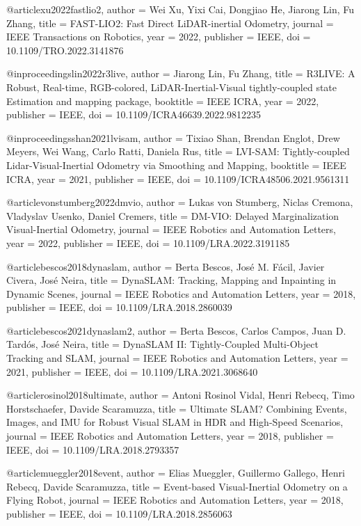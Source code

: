 @article{xu2022fastlio2,
  author = {Wei Xu, Yixi Cai, Dongjiao He, Jiarong Lin, Fu Zhang},
  title = {FAST-LIO2: Fast Direct LiDAR-inertial Odometry},
  journal = {IEEE Transactions on Robotics},
  year = {2022},
  publisher = {IEEE},
  doi = {10.1109/TRO.2022.3141876}
}

@inproceedings{lin2022r3live,
  author = {Jiarong Lin, Fu Zhang},
  title = {R3LIVE: A Robust, Real-time, RGB-colored, LiDAR-Inertial-Visual tightly-coupled state Estimation and mapping package},
  booktitle = {IEEE ICRA},
  year = {2022},
  publisher = {IEEE},
  doi = {10.1109/ICRA46639.2022.9812235}
}

@inproceedings{shan2021lvisam,
  author = {Tixiao Shan, Brendan Englot, Drew Meyers, Wei Wang, Carlo Ratti, Daniela Rus},
  title = {LVI-SAM: Tightly-coupled Lidar-Visual-Inertial Odometry via Smoothing and Mapping},
  booktitle = {IEEE ICRA},
  year = {2021},
  publisher = {IEEE},
  doi = {10.1109/ICRA48506.2021.9561311}
}

@article{vonstumberg2022dmvio,
  author = {Lukas von Stumberg, Niclas Cremona, Vladyslav Usenko, Daniel Cremers},
  title = {DM-VIO: Delayed Marginalization Visual-Inertial Odometry},
  journal = {IEEE Robotics and Automation Letters},
  year = {2022},
  publisher = {IEEE},
  doi = {10.1109/LRA.2022.3191185}
}

@article{bescos2018dynaslam,
  author = {Berta Bescos, José M. Fácil, Javier Civera, José Neira},
  title = {DynaSLAM: Tracking, Mapping and Inpainting in Dynamic Scenes},
  journal = {IEEE Robotics and Automation Letters},
  year = {2018},
  publisher = {IEEE},
  doi = {10.1109/LRA.2018.2860039}
}

@article{bescos2021dynaslam2,
  author = {Berta Bescos, Carlos Campos, Juan D. Tardós, José Neira},
  title = {DynaSLAM II: Tightly-Coupled Multi-Object Tracking and SLAM},
  journal = {IEEE Robotics and Automation Letters},
  year = {2021},
  publisher = {IEEE},
  doi = {10.1109/LRA.2021.3068640}
}

@article{rosinol2018ultimate,
  author = {Antoni Rosinol Vidal, Henri Rebecq, Timo Horstschaefer, Davide Scaramuzza},
  title = {Ultimate SLAM? Combining Events, Images, and IMU for Robust Visual SLAM in HDR and High-Speed Scenarios},
  journal = {IEEE Robotics and Automation Letters},
  year = {2018},
  publisher = {IEEE},
  doi = {10.1109/LRA.2018.2793357}
}

@article{mueggler2018event,
  author = {Elias Mueggler, Guillermo Gallego, Henri Rebecq, Davide Scaramuzza},
  title = {Event-based Visual-Inertial Odometry on a Flying Robot},
  journal = {IEEE Robotics and Automation Letters},
  year = {2018},
  publisher = {IEEE},
  doi = {10.1109/LRA.2018.2856063}
}

